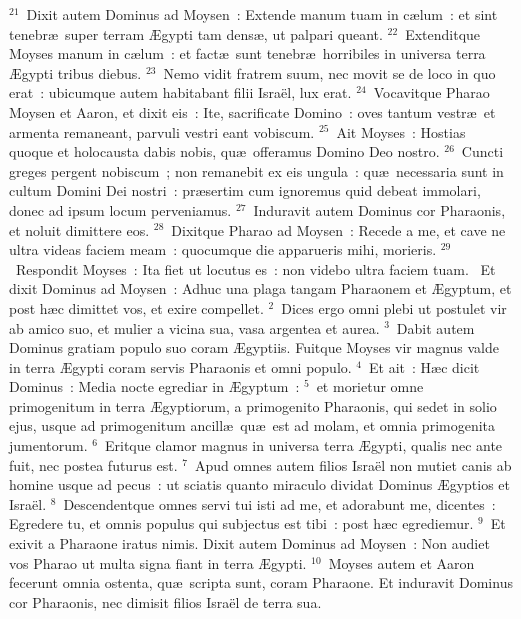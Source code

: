 ${}^{21}$~Dixit autem Dominus ad Moysen~: Extende manum tuam in c\ae lum~: et sint tenebr\ae\ super terram \AE gypti tam dens\ae , ut palpari queant.
${}^{22}$~Extenditque Moyses manum in c\ae lum~: et fact\ae\ sunt tenebr\ae\ horribiles in universa terra \AE gypti tribus diebus.
${}^{23}$~Nemo vidit fratrem suum, nec movit se de loco in quo erat~: ubicumque autem habitabant filii Isra\"el, lux erat.
${}^{24}$~Vocavitque Pharao Moysen et Aaron, et dixit eis~: Ite, sacrificate Domino~: oves tantum vestr\ae\ et armenta remaneant, parvuli vestri eant vobiscum.
${}^{25}$~Ait Moyses~: Hostias quoque et holocausta dabis nobis, qu\ae\ offeramus Domino Deo nostro.
${}^{26}$~Cuncti greges pergent nobiscum~; non remanebit ex eis ungula~: qu\ae\ necessaria sunt in cultum Domini Dei nostri~: pr\ae sertim cum ignoremus quid debeat immolari, donec ad ipsum locum perveniamus.
${}^{27}$~Induravit autem Dominus cor Pharaonis, et noluit dimittere eos.
${}^{28}$~Dixitque Pharao ad Moysen~: Recede a me, et cave ne ultra videas faciem meam~: quocumque die apparueris mihi, morieris.
${}^{29}$~Respondit Moyses~: Ita fiet ut locutus es~: non videbo ultra faciem tuam.
~\lettrine[lines=10,image=true,loversize=0.05,lraise=-0.03]{E}{}t dixit Dominus ad Moysen~: Adhuc una plaga tangam Pharaonem et \AE gyptum, et post h\ae c dimittet vos, et exire compellet.
${}^{2}$~Dices ergo omni plebi ut postulet vir ab amico suo, et mulier a vicina sua, vasa argentea et aurea.
${}^{3}$~Dabit autem Dominus gratiam populo suo coram \AE gyptiis. Fuitque Moyses vir magnus valde in terra \AE gypti coram servis Pharaonis et omni populo.
${}^{4}$~Et ait~: H\ae c dicit Dominus~: Media nocte egrediar in \AE gyptum~:
${}^{5}$~et morietur omne primogenitum in terra \AE gyptiorum, a primogenito Pharaonis, qui sedet in solio ejus, usque ad primogenitum ancill\ae\ qu\ae\ est ad molam, et omnia primogenita jumentorum.
${}^{6}$~Eritque clamor magnus in universa terra \AE gypti, qualis nec ante fuit, nec postea futurus est.
${}^{7}$~Apud omnes autem filios Isra\"el non mutiet canis ab homine usque ad pecus~: ut sciatis quanto miraculo dividat Dominus \AE gyptios et Isra\"el.
${}^{8}$~Descendentque omnes servi tui isti ad me, et adorabunt me, dicentes~: Egredere tu, et omnis populus qui subjectus est tibi~: post h\ae c egrediemur.
${}^{9}$~Et exivit a Pharaone iratus nimis. Dixit autem Dominus ad Moysen~: Non audiet vos Pharao ut multa signa fiant in terra \AE gypti.
${}^{10}$~Moyses autem et Aaron fecerunt omnia ostenta, qu\ae\ scripta sunt, coram Pharaone. Et induravit Dominus cor Pharaonis, nec dimisit filios Isra\"el de terra sua.
